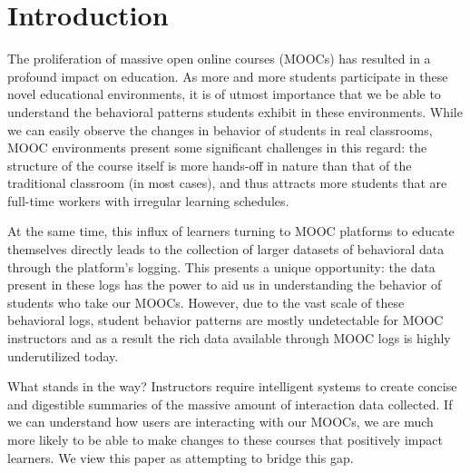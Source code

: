 \section{Introduction}

The proliferation of massive open online courses (MOOCs) has resulted in a
profound impact on education. As more and more students participate in
these novel educational environments, it is of utmost importance that we be
able to understand the behavioral patterns students exhibit in these
environments. While we can easily observe the changes in behavior of
students in real classrooms, MOOC environments present some significant
challenges in this regard: the structure of the course itself is more
hands-off in nature than that of the traditional classroom (in most cases),
and thus attracts more students that are full-time workers with irregular
learning schedules.

At the same time, this influx of learners turning to MOOC platforms to
educate themselves directly leads to the collection of larger datasets of
behavioral data through the platform's logging. This presents a unique
opportunity: the data present in these logs has the power to aid us in
understanding the behavior of students who take our MOOCs. However, due to
the vast scale of these behavioral logs, student behavior patterns are
mostly undetectable for MOOC instructors and as a result the rich data
available through MOOC logs is highly underutilized today.

What stands in the way? Instructors require intelligent systems to create
concise and digestible summaries of the massive amount of interaction data
collected. If we can understand how users are interacting with our MOOCs,
we are much more likely to be able to make changes to these courses that
positively impact learners. We view this paper as attempting to bridge this
gap.

